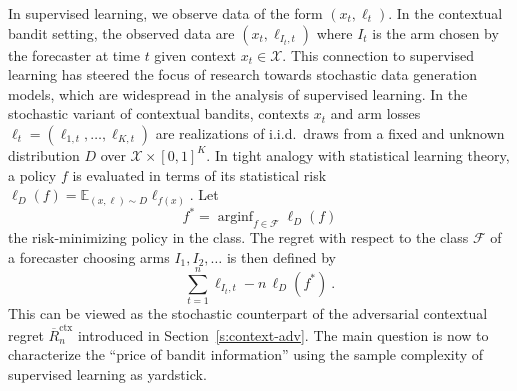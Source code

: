 \documentclass[11pt]{hackednow}
\newcommand{\E}{\mathbb{E}}
\newcommand{\cF}{\mathcal{F}}
\newcommand{\cX}{\mathcal{X}}
\newcommand{\oR}{\overline{R}}
\newcommand{\arginf}{\mathop{\mathrm{arginf}}}
\newcommand{\oRx}{\oR^{\mathrm{ctx}}}
\begin{document}
In supervised learning, we observe data of the form $(x_t,\ell_t)$. In the contextual bandit setting, the observed data are $(x_t,\ell_{I_t,t})$ where $I_t$ is the arm chosen by the forecaster at time $t$ given context $x_t\in\cX$. This connection to supervised learning has steered the focus of research towards stochastic data generation models, which are widespread in the analysis of supervised learning. In the stochastic variant of contextual bandits, contexts $x_t$ and arm losses $\ell_t = (\ell_{1,t},\dots,\ell_{K,t})$ are realizations of i.i.d.\ draws from a fixed and unknown distribution $D$ over $\cX \times [0,1]^K$. In tight analogy with statistical learning theory, a policy $f$ is evaluated in terms of its statistical risk
$
    \ell_D(f) = \E_{(x,\ell) \sim D} \ell_{f(x)}
$.
Let
\[
    f^* = \arginf_{f\in\cF} \ell_D(f)
\]
the risk-minimizing policy in the class.
The regret with respect to the class $\cF$ of a forecaster choosing arms $I_1,I_2,\dots$ is then defined by
\[
    \sum_{t=1}^n \ell_{I_t,t} - n\,\ell_D(f^*)~.
\]
This can be viewed as the stochastic counterpart of the adversarial contextual regret $\oRx_n$ introduced in Section~\ref{s:context-adv}. The main question is now to characterize the ``price of bandit information'' using the sample complexity of supervised learning as yardstick.
\end{document}
